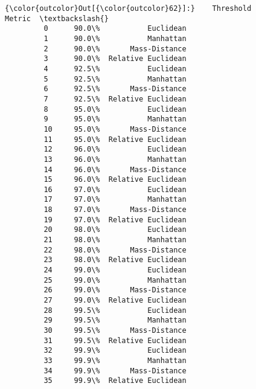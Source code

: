 \documentclass[11pt]{article}
\begin{document}
\begin{Verbatim}[commandchars=\\\{\}]
{\color{outcolor}Out[{\color{outcolor}62}]:}    Threshold              Metric  \textbackslash{}
         0      90.0\%           Euclidean   
         1      90.0\%           Manhattan   
         2      90.0\%       Mass-Distance   
         3      90.0\%  Relative Euclidean   
         4      92.5\%           Euclidean   
         5      92.5\%           Manhattan   
         6      92.5\%       Mass-Distance   
         7      92.5\%  Relative Euclidean   
         8      95.0\%           Euclidean   
         9      95.0\%           Manhattan   
         10     95.0\%       Mass-Distance   
         11     95.0\%  Relative Euclidean   
         12     96.0\%           Euclidean   
         13     96.0\%           Manhattan   
         14     96.0\%       Mass-Distance   
         15     96.0\%  Relative Euclidean   
         16     97.0\%           Euclidean   
         17     97.0\%           Manhattan   
         18     97.0\%       Mass-Distance   
         19     97.0\%  Relative Euclidean   
         20     98.0\%           Euclidean   
         21     98.0\%           Manhattan   
         22     98.0\%       Mass-Distance   
         23     98.0\%  Relative Euclidean   
         24     99.0\%           Euclidean   
         25     99.0\%           Manhattan   
         26     99.0\%       Mass-Distance   
         27     99.0\%  Relative Euclidean   
         28     99.5\%           Euclidean   
         29     99.5\%           Manhattan   
         30     99.5\%       Mass-Distance   
         31     99.5\%  Relative Euclidean   
         32     99.9\%           Euclidean   
         33     99.9\%           Manhattan   
         34     99.9\%       Mass-Distance   
         35     99.9\%  Relative Euclidean   
         

\end{Verbatim}
\end{document}
